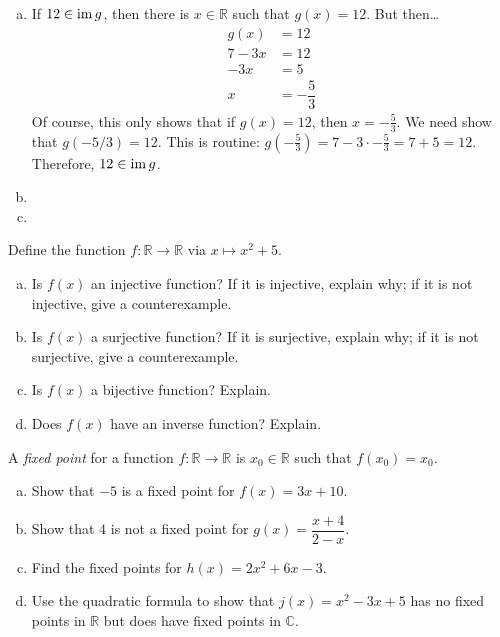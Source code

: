 \documentclass[12pt,letterpaper]{exam}
\begin{document}
\begin{questions}
{\begin{enumerate}[(a)]
\item If $12 \in \operatorname{im} g$, then there is $x \in \mathbb{R}$ such that $g(x)= 12$. But then\dots
	\[
	\begin{aligned}
	g(x)&= 12 \\
	7 - 3x&= 12 \\
	-3x&= 5 \\
	x&= -\dfrac{5}{3}
	\end{aligned}
	\]
Of course, this only shows that if $g(x)= 12$, then $x= -\frac{5}{3}$. We need show that $g(-5/3)= 12$. This is routine: $g \left(-\frac{5}{3} \right)= 7 - 3 \cdot -\frac{5}{3}= 7 + 5= 12$. Therefore, $12 \in \operatorname{im} g$. \pspace

\item 
\item 
\end{enumerate}
}



\newpage
\question[10] Define the function $f: \mathbb{R} \to \mathbb{R}$ via $x \mapsto x^2 + 5$. 
	\begin{enumerate}[(a)]
	\item Is $f(x)$ an injective function? If it is injective, explain why; if it is not injective, give a counterexample. 
	\item Is $f(x)$ a surjective function? If it is surjective, explain why; if it is not surjective, give a counterexample. 
	\item Is $f(x)$ a bijective function? Explain. 
	\item Does $f(x)$ have an inverse function? Explain. 
	\end{enumerate} \pspace

\sol {\itshape 
\begin{enumerate}[(a)]
\item 
\item 
\item 
\item 
\end{enumerate}
}



\newpage
\question[10] A \textit{fixed point} for a function $f: \mathbb{R} \to \mathbb{R}$ is $x_0 \in \mathbb{R}$ such that $f(x_0)= x_0$. 
	\begin{enumerate}[(a)]
	\item Show that $-5$ is a fixed point for $f(x)= 3x + 10$.
	\item Show that $4$ is not a fixed point for $g(x)= \dfrac{x + 4}{2 - x}$.
	\item Find the fixed points for $h(x)= 2x^2 + 6x - 3$. 
	\item Use the quadratic formula to show that $j(x)= x^2 - 3x + 5$ has no fixed points in $\mathbb{R}$ but does have fixed points in $\mathbb{C}$. 
	\end{enumerate} \pspace


\end{questions}
\end{document}

